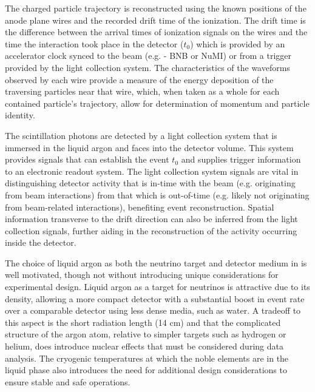 The charged particle trajectory is reconstructed using the known positions of the anode plane wires and the recorded drift time of the ionization.  The drift time is the difference between the arrival times of ionization signals on the wires and the time the interaction took place in the detector ($t_0$) which is provided by an accelerator clock synced to the beam (e.g. - BNB or NuMI) or from a trigger provided by the light collection system.  The characteristics of the waveforms observed by each wire provide a measure of the energy deposition of the traversing particles near that wire, which, when taken as a whole for each contained particle's trajectory, allow for determination of momentum and particle identity. 


The scintillation photons are detected by a light collection system that is immersed in the liquid argon and faces into the detector volume.  This system provides signals that can establish the event $t_0$ and supplies trigger information to an electronic readout system.  The light collection system signals are vital in distinguishing detector activity that is in-time with the beam (e.g. originating from beam interactions) from that which is out-of-time (e.g. likely not originating from beam-related interactions), benefiting event reconstruction.  Spatial information transverse to the drift direction can also be inferred from the light collection signals, further aiding in the reconstruction of the activity occurring inside the detector.


The choice of liquid argon as both the neutrino target and detector medium in \lartpcs is well motivated, though not without introducing unique considerations for experimental design.  Liquid argon as a target for neutrinos is attractive due to its density, allowing a more compact detector with a substantial boost in event rate over a comparable detector using less dense media, such as water.  A tradeoff to this aspect is the short radiation length (14 cm) and that the complicated structure of the argon atom, relative to simpler targets such as hydrogen or helium, does introduce nuclear effects that must be considered during data analysis.  The cryogenic temperatures at which the noble elements are in the liquid phase also introduces the need for additional design considerations to ensure stable and safe operations.

